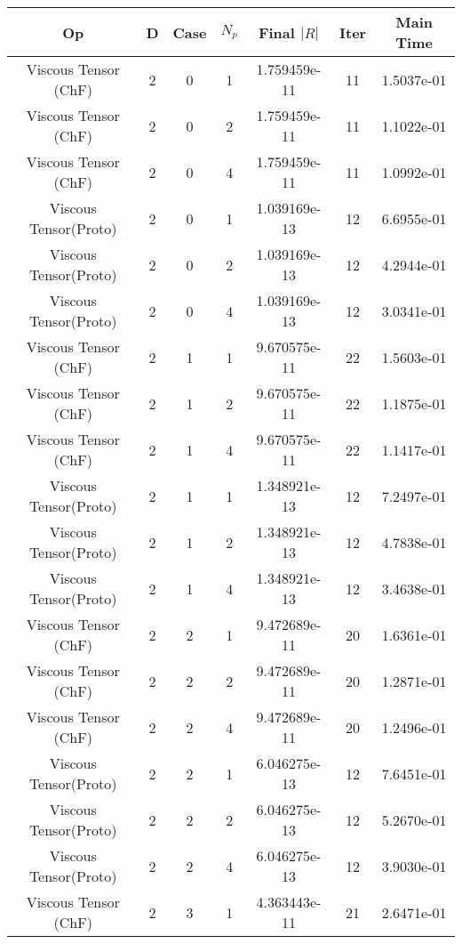 \documentclass{article}
\begin{document}
\begin{small} 
  \begin{table} 
    \begin{center}
      \begin{tabular}{|c|c|c|c|c|c||c|} \hline 
Op & D & Case & $N_p$ & Final $|R|$  &  Iter & Main Time \\  
        \hline 
        Viscous Tensor  (ChF) & 2 & 0 & 1& 1.759459e-11 & 11 & 1.5037e-01\\
        Viscous Tensor  (ChF) & 2 & 0 & 2& 1.759459e-11 & 11 & 1.1022e-01\\
        Viscous Tensor  (ChF) & 2 & 0 & 4& 1.759459e-11 & 11 & 1.0992e-01\\
        Viscous Tensor(Proto) & 2 & 0 & 1& 1.039169e-13 & 12 & 6.6955e-01\\
        Viscous Tensor(Proto) & 2 & 0 & 2& 1.039169e-13 & 12 & 4.2944e-01\\
        Viscous Tensor(Proto) & 2 & 0 & 4& 1.039169e-13 & 12 & 3.0341e-01\\
        \hline 
        Viscous Tensor  (ChF) & 2 & 1 & 1& 9.670575e-11 & 22 & 1.5603e-01\\
        Viscous Tensor  (ChF) & 2 & 1 & 2& 9.670575e-11 & 22 & 1.1875e-01\\
        Viscous Tensor  (ChF) & 2 & 1 & 4& 9.670575e-11 & 22 & 1.1417e-01\\
        Viscous Tensor(Proto) & 2 & 1 & 1& 1.348921e-13 & 12 & 7.2497e-01\\
        Viscous Tensor(Proto) & 2 & 1 & 2& 1.348921e-13 & 12 & 4.7838e-01\\
        Viscous Tensor(Proto) & 2 & 1 & 4& 1.348921e-13 & 12 & 3.4638e-01\\
        \hline 
        Viscous Tensor  (ChF) & 2 & 2 & 1& 9.472689e-11 & 20 & 1.6361e-01\\
        Viscous Tensor  (ChF) & 2 & 2 & 2& 9.472689e-11 & 20 & 1.2871e-01\\
        Viscous Tensor  (ChF) & 2 & 2 & 4& 9.472689e-11 & 20 & 1.2496e-01\\
        Viscous Tensor(Proto) & 2 & 2 & 1& 6.046275e-13 & 12 & 7.6451e-01\\
        Viscous Tensor(Proto) & 2 & 2 & 2& 6.046275e-13 & 12 & 5.2670e-01\\
        Viscous Tensor(Proto) & 2 & 2 & 4& 6.046275e-13 & 12 & 3.9030e-01\\
        \hline 
        Viscous Tensor  (ChF) & 2 & 3 & 1& 4.363443e-11 & 21 & 2.6471e-01\\

\end{tabular}
\end{center}
\end{table}
\end{small}
\end{document}

